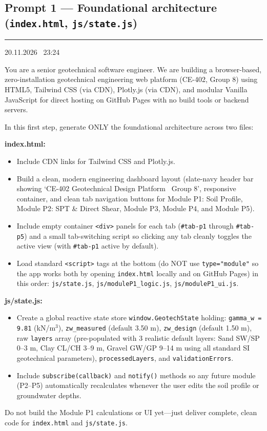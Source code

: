 \documentclass[11pt,a4paper]{article}
\newcommand{\stamp}[1]{{\small\bfseries\color{black!70}\textcolor{accent}{\rule[-2pt]{2pt}{10pt}}\hspace{6pt}#1}\par}
\newcommand{\code}[1]{\texttt{\small #1}}
\begin{document}
\subsection{Prompt 1 --- Foundational architecture (\code{index.html}, \code{js/state.js})}
\stamp{20.11.2026 \textbar\ 23:24}
\begin{prompt}
You are a senior geotechnical software engineer. We are building a browser-based, zero-installation geotechnical
engineering web platform (CE-402, Group 8) using HTML5, Tailwind CSS (via CDN), Plotly.js (via CDN), and modular
Vanilla JavaScript for direct hosting on GitHub Pages with no build tools or backend servers.

In this first step, generate ONLY the foundational architecture across two files:

\textbf{index.html:}
\begin{itemize}
\item Include CDN links for Tailwind CSS and Plotly.js.
\item Build a clean, modern engineering dashboard layout (slate-navy header bar showing `CE-402 Geotechnical Design
  Platform \textbar\ Group 8', responsive container, and clean tab navigation buttons for Module P1: Soil Profile,
  Module P2: SPT \& Direct Shear, Module P3, Module P4, and Module P5).
\item Include empty container \code{<div>} panels for each tab (\code{\#tab-p1} through \code{\#tab-p5}) and a small
  tab-switching script so clicking any tab cleanly toggles the active view (with \code{\#tab-p1} active by default).
\item Load standard \code{<script>} tags at the bottom (do NOT use \code{type="module"} so the app works both by
  opening \code{index.html} locally and on GitHub Pages) in this order: \code{js/state.js},
  \code{js/moduleP1\_logic.js}, \code{js/moduleP1\_ui.js}.
\end{itemize}

\textbf{js/state.js:}
\begin{itemize}
\item Create a global reactive state store \code{window.GeotechState} holding: \code{gamma\_w = 9.81} (kN/m$^3$),
  \code{zw\_measured} (default 3.50 m), \code{zw\_design} (default 1.50 m), raw \code{layers} array (pre-populated
  with 3 realistic default layers: Sand SW/SP 0--3 m, Clay CL/CH 3--9 m, Gravel GW/GP 9--14 m using all standard SI
  geotechnical parameters), \code{processedLayers}, and \code{validationErrors}.
\item Include \code{subscribe(callback)} and \code{notify()} methods so any future module (P2--P5) automatically
  recalculates whenever the user edits the soil profile or groundwater depths.
\end{itemize}
Do not build the Module P1 calculations or UI yet---just deliver complete, clean code for \code{index.html} and
\code{js/state.js}.
\end{prompt}
\end{document}
